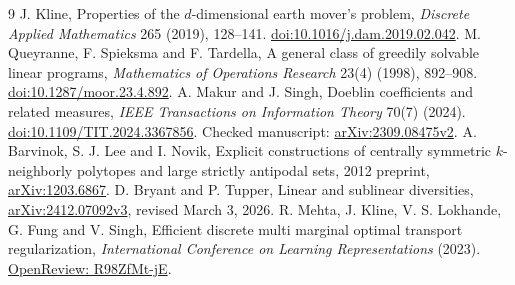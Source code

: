 \documentclass[11pt]{article}
\theoremstyle{definition}\newtheorem{definition}[theorem]{Definition}
\newcommand{\1}{\mathbf 1}
\begin{document}
\clearpage
\begin{thebibliography}{9}
 J. Kline, Properties of the $d$-dimensional earth mover's problem,
\emph{Discrete Applied Mathematics} 265 (2019), 128--141.
\href{https://doi.org/10.1016/j.dam.2019.02.042}{doi:10.1016/j.dam.2019.02.042}.
 M. Queyranne, F. Spieksma and F. Tardella, A general class of greedily
solvable linear programs, \emph{Mathematics of Operations Research} 23(4) (1998),
892--908. \href{https://doi.org/10.1287/moor.23.4.892}{doi:10.1287/moor.23.4.892}.
 A. Makur and J. Singh, Doeblin coefficients and related measures,
\emph{IEEE Transactions on Information Theory} 70(7) (2024).
\href{https://doi.org/10.1109/TIT.2024.3367856}{doi:10.1109/TIT.2024.3367856}.
Checked manuscript: \href{https://arxiv.org/abs/2309.08475v2}{arXiv:2309.08475v2}.
 A. Barvinok, S. J. Lee and I. Novik, Explicit constructions of
centrally symmetric $k$-neighborly polytopes and large strictly antipodal sets,
2012 preprint, \href{https://arxiv.org/abs/1203.6867}{arXiv:1203.6867}.
 D. Bryant and P. Tupper, Linear and sublinear diversities,
\href{https://arxiv.org/abs/2412.07092v3}{arXiv:2412.07092v3}, revised March 3, 2026.
 R. Mehta, J. Kline, V. S. Lokhande, G. Fung and V. Singh,
Efficient discrete multi marginal optimal transport regularization,
\emph{International Conference on Learning Representations} (2023).
\href{https://openreview.net/forum?id=R98ZfMt-jE}{OpenReview: R98ZfMt-jE}.
\end{thebibliography}
\end{document}
